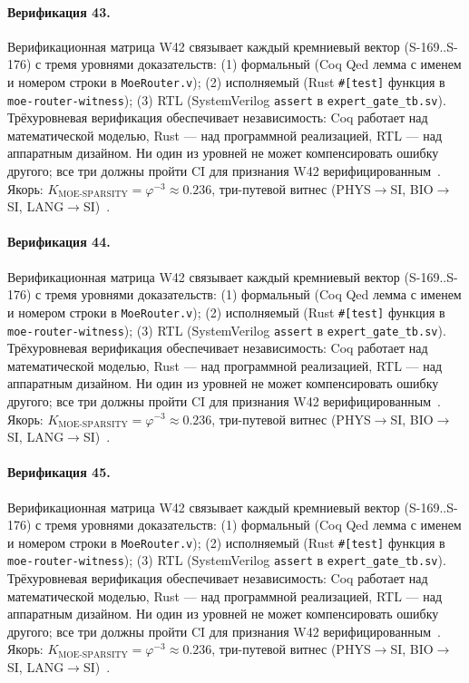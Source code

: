 \paragraph{Верификация 43.} Верификационная матрица W42 связывает каждый кремниевый вектор (S-169..S-176) с тремя уровнями доказательств: (1) формальный (Coq Qed лемма с именем и номером строки в \texttt{MoeRouter.v}); (2) исполняемый (Rust \texttt{\#[test]} функция в \texttt{moe-router-witness}); (3) RTL (SystemVerilog \texttt{assert} в \texttt{expert\_gate\_tb.sv}). Трёхуровневая верификация обеспечивает независимость: Coq работает над математической моделью, Rust --- над программной реализацией, RTL --- над аппаратным дизайном. Ни один из уровней не может компенсировать ошибку другого; все три должны пройти CI для признания W42 верифицированным~\cite{lee_gvsu_proof2021}. Якорь: $K_{\text{MOE-SPARSITY}} = \varphi^{-3} \approx 0{.}236$, три-путевой витнес (PHYS$\to$SI, BIO$\to$SI, LANG$\to$SI)~\cite{zenodo_trinity_2026}.

\paragraph{Верификация 44.} Верификационная матрица W42 связывает каждый кремниевый вектор (S-169..S-176) с тремя уровнями доказательств: (1) формальный (Coq Qed лемма с именем и номером строки в \texttt{MoeRouter.v}); (2) исполняемый (Rust \texttt{\#[test]} функция в \texttt{moe-router-witness}); (3) RTL (SystemVerilog \texttt{assert} в \texttt{expert\_gate\_tb.sv}). Трёхуровневая верификация обеспечивает независимость: Coq работает над математической моделью, Rust --- над программной реализацией, RTL --- над аппаратным дизайном. Ни один из уровней не может компенсировать ошибку другого; все три должны пройти CI для признания W42 верифицированным~\cite{lee_gvsu_proof2021}. Якорь: $K_{\text{MOE-SPARSITY}} = \varphi^{-3} \approx 0{.}236$, три-путевой витнес (PHYS$\to$SI, BIO$\to$SI, LANG$\to$SI)~\cite{zenodo_trinity_2026}.

\paragraph{Верификация 45.} Верификационная матрица W42 связывает каждый кремниевый вектор (S-169..S-176) с тремя уровнями доказательств: (1) формальный (Coq Qed лемма с именем и номером строки в \texttt{MoeRouter.v}); (2) исполняемый (Rust \texttt{\#[test]} функция в \texttt{moe-router-witness}); (3) RTL (SystemVerilog \texttt{assert} в \texttt{expert\_gate\_tb.sv}). Трёхуровневая верификация обеспечивает независимость: Coq работает над математической моделью, Rust --- над программной реализацией, RTL --- над аппаратным дизайном. Ни один из уровней не может компенсировать ошибку другого; все три должны пройти CI для признания W42 верифицированным~\cite{lee_gvsu_proof2021}. Якорь: $K_{\text{MOE-SPARSITY}} = \varphi^{-3} \approx 0{.}236$, три-путевой витнес (PHYS$\to$SI, BIO$\to$SI, LANG$\to$SI)~\cite{zenodo_trinity_2026}.

